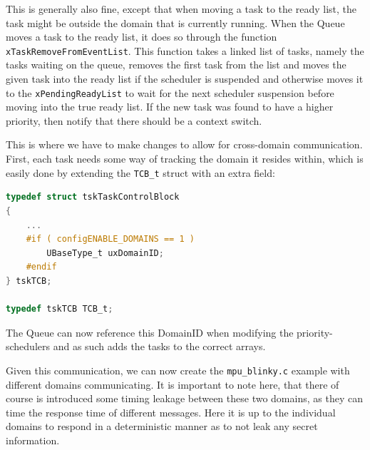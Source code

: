 This is generally also fine, except that when moving a task to the ready list,
the task might be outside the domain that is currently running. When the Queue
moves a task to the ready list, it does so through the function
\texttt{xTaskRemoveFromEventList}. This function takes a linked list of tasks,
namely the tasks waiting on the queue, removes the first task from the list
and moves the given task into the ready list if the scheduler is suspended and
otherwise moves it to the \texttt{xPendingReadyList} to wait for the next
scheduler suspension before moving into the true ready list. If the new task
was found to have a higher priority, then notify that there should be a context
switch.

This is where we have to make changes to allow for cross-domain communication.
First, each task needs some way of tracking the domain it resides within, which
is easily done by extending the \texttt{TCB\_t} struct with an extra field:
\begin{lstlisting}[language={c}]
typedef struct tskTaskControlBlock
{
    ...
    #if ( configENABLE_DOMAINS == 1 )
        UBaseType_t uxDomainID;
    #endif
} tskTCB;

typedef tskTCB TCB_t;
\end{lstlisting}

The Queue can now reference this DomainID when modifying the
priority-schedulers and as such adds the tasks to the correct arrays.

Given this communication, we can now create the \texttt{mpu\_blinky.c} example
with different domains communicating. It is important to note here, that there
of course is introduced some timing leakage between these two domains, as they
can time the response time of different messages. Here it is up to the
individual domains to respond in a deterministic manner as to not leak any
secret information.


